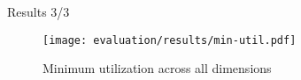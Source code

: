 \begin{frame}{Results 3/3}
    \vspace{2mm}
    \begin{figure}
        \captionsetup{font=footnotesize}
        \texttt{[image: evaluation/results/min-util.pdf]}
        \vspace{2mm}
        \caption{Minimum  utilization across all dimensions}
    \end{figure}
\end{frame}
